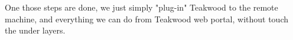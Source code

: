 One those steps are done, we just simply "plug-in" Teakwood to the remote machine, and everything we can do from Teakwood web portal, without touch the under layers.







